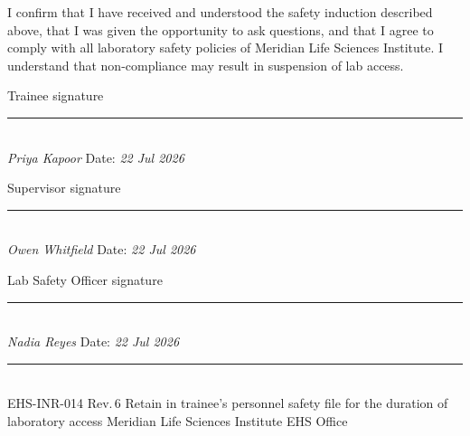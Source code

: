 \documentclass[10pt,a4paper]{article}
\begin{document}
\vspace{5pt}

\footnotesize\color{slateGray}
I confirm that I have received and understood the safety induction described above, that I was given the opportunity to ask questions, and that I agree to comply with all laboratory safety policies of Meridian Life Sciences Institute. I understand that non-compliance may result in suspension of lab access.
\color{black}

\vspace{6pt}

\noindent
\begin{minipage}[t]{0.32\linewidth}
{\footnotesize\color{slateGray} Trainee signature}\\[10pt]
{\color{lineGray}\rule{0.9\linewidth}{0.5pt}}\\[2pt]
{\itshape\small Priya Kapoor} \hfill {\footnotesize\color{slateGray} Date: \textit{22 Jul 2026}}
\end{minipage}%
\hfill
\begin{minipage}[t]{0.32\linewidth}
{\footnotesize\color{slateGray} Supervisor signature}\\[10pt]
{\color{lineGray}\rule{0.9\linewidth}{0.5pt}}\\[2pt]
{\itshape\small Owen Whitfield} \hfill {\footnotesize\color{slateGray} Date: \textit{22 Jul 2026}}
\end{minipage}%
\hfill
\begin{minipage}[t]{0.32\linewidth}
{\footnotesize\color{slateGray} Lab Safety Officer signature}\\[10pt]
{\color{lineGray}\rule{0.9\linewidth}{0.5pt}}\\[2pt]
{\itshape\small Nadia Reyes} \hfill {\footnotesize\color{slateGray} Date: \textit{22 Jul 2026}}
\end{minipage}

\vspace{4pt}
{\color{lineGray}\rule{\linewidth}{0.4pt}}\\[2pt]
{\scriptsize\color{slateGray} EHS-INR-014 Rev.\,6 \;\textbullet\; Retain in trainee's personnel safety file for the duration of laboratory access \;\textbullet\; Meridian Life Sciences Institute EHS Office}
\end{document}
